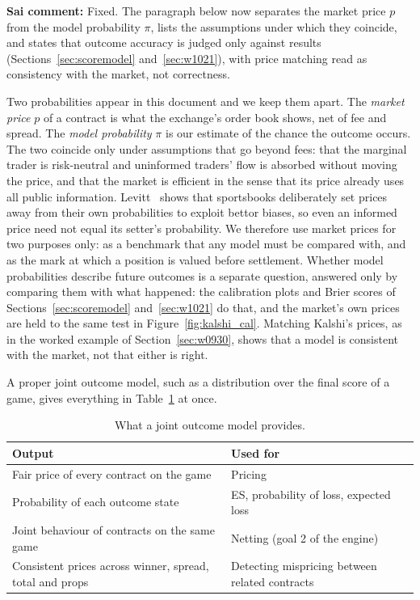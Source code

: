 {\color{blue}\textbf{Sai comment:} Fixed. The paragraph below now separates the market price $p$ from the model probability $\pi$, lists the assumptions under which they coincide, and states that outcome accuracy is judged only against results (Sections~\ref{sec:scoremodel} and~\ref{sec:w1021}), with price matching read as consistency with the market, not correctness.}

Two probabilities appear in this document and we keep them apart. The \emph{market price} $p$ of a contract is what the exchange's order book shows, net of fee and spread. The \emph{model probability} $\pi$ is our estimate of the chance the outcome occurs. The two coincide only under assumptions that go beyond fees: that the marginal trader is risk-neutral and uninformed traders' flow is absorbed without moving the price, and that the market is efficient in the sense that its price already uses all public information. Levitt~\cite{levitt2004} shows that sportsbooks deliberately set prices away from their own probabilities to exploit bettor biases, so even an informed price need not equal its setter's probability. We therefore use market prices for two purposes only: as a benchmark that any model must be compared with, and as the mark at which a position is valued before settlement. Whether model probabilities describe future outcomes is a separate question, answered only by comparing them with what happened: the calibration plots and Brier scores of Sections~\ref{sec:scoremodel} and~\ref{sec:w1021} do that, and the market's own prices are held to the same test in Figure~\ref{fig:kalshi_cal}. Matching Kalshi's prices, as in the worked example of Section~\ref{sec:w0930}, shows that a model is consistent with the market, not that either is right.

A proper joint outcome model, such as a distribution over the final score of a game, gives everything in Table~\ref{tab:joint_uses} at once.

\begin{table}[H]
\centering
\small
\begin{tabular}{p{6.5cm}p{6.5cm}}
\toprule
\textbf{Output} & \textbf{Used for} \\
\midrule
Fair price of every contract on the game & Pricing \\
Probability of each outcome state & ES, probability of loss, expected loss \\
Joint behaviour of contracts on the same game & Netting (goal 2 of the engine) \\
Consistent prices across winner, spread, total and props & Detecting mispricing between related contracts \\
\bottomrule
\end{tabular}
\caption{What a joint outcome model provides.}
\label{tab:joint_uses}
\end{table}

